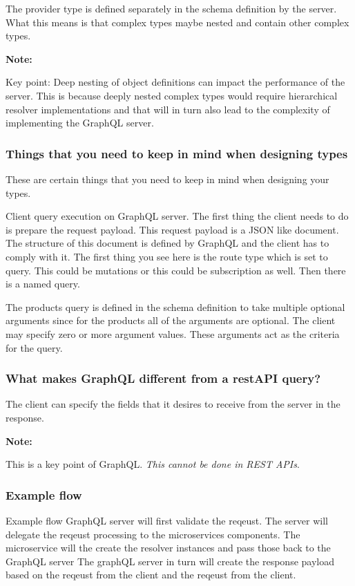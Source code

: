 \documentclass[a4paper, 11pt]{book}
\newenvironment{note}{
    \begin{siderule}
        \textbf{Note: }
        }{
    \end{siderule}
}
\begin{document}

    The provider type is defined separately in the schema definition by the server.
    What this means is that complex types maybe nested and contain other complex types.

    \begin{note}
        Key point: Deep nesting of object definitions can impact the performance of the server. %
        This is because deeply nested complex types would require hierarchical resolver implementations and that will in turn also lead to the complexity of implementing the GraphQL server.
    \end{note}

    \subsubsection{Things that you need to keep in mind when designing types}

    These are certain things that you need to keep in mind when designing your types.

    Client query execution on GraphQL server.
    The first thing the client needs to do is prepare the request payload.
    This request payload is a JSON like document.
    The structure of this document is defined by GraphQL and the client has to comply with it.
    The first thing you see here is the route type which is set to query.
    This could be mutations or this could be subscription as well.
    Then there is a named query.

    The products query is defined in the schema definition to take multiple optional arguments since for the products all of the arguments are optional.
    The client may specify zero or more argument values.
    These arguments act as the criteria for the query.

    \subsubsection{What makes GraphQL different from a restAPI query?}
    The client can specify the fields that it desires to receive from the server in the response.

    \begin{note}
        This is a key point of GraphQL. \textit{This cannot be done in REST APIs}.
    \end{note}

    \subsubsection{Example flow}
    Example flow
    GraphQL server will first validate the reqeust.
    The server will delegate the reqeust processing to the microservices components.
    The microservice will the create the resolver instances and pass those back to the GraphQL server
    The graphQL server in turn will create the response payload based on the reqeust from the client and the reqeust from the client.
\end{document}
